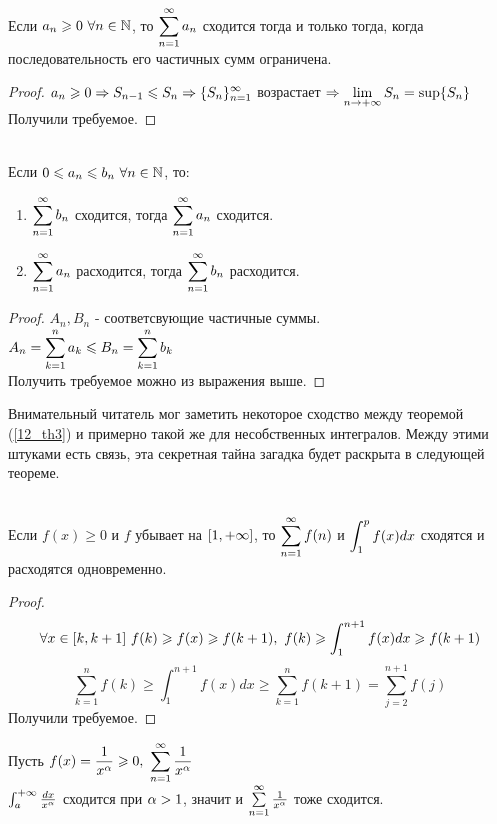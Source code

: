 \begin{theorem}\label{12_th2}\\
	Если $a_n\geqslant0\ \forall n\in\mathbb{N}$, то $\ds\sum_{n=1}^\i a_n$ сходится тогда и только тогда, когда последовательность его частичных сумм ограничена.
\end{theorem}
\begin{proof}
	$\displaystyle a_n\geqslant0\Rightarrow S_{n-1}\leqslant S_n\Rightarrow\{S_n\}_{n=1}^\infty$ возрастает $\ds\Ra\lim_{n\ra\p}S_n=\sup\{S_n\}$\\
	Получили требуемое.
\end{proof}
\begin{theorem}\label{12_th3}\\
	Если $0\leqslant a_n\leqslant b_n\ \forall n\in\mathbb{N}$, то:
	\begin{enumerate}
		\item $\ds\ss b_n$ сходится, тогда $\ds\ss a_n$ сходится.
		\item $\ds\ss a_n$ расходится, тогда $\ds\ss b_n$ расходится.
	\end{enumerate}
\end{theorem}
\begin{proof}
	$A_n,B_n$ - соответсвующие частичные суммы.\\
	$\ds A_n=\sum_{k=1}^n a_k\le B_n=\sum_{k=1}^n b_k$\\
	Получить требуемое можно из выражения выше.
\end{proof}
\begin{note}
	Внимательный читатель мог заметить некоторое сходство между теоремой (\ref{12_th3}) и примерно такой же для несобственных интегралов. Между этими штуками есть связь, эта секретная тайна загадка будет раскрыта в следующей теореме.
\end{note}
\begin{theorem}\label{12_th4}\\
	Если $f(x)\ge0$ и $f$ убывает на $[1,{+\infty}]$, то $\ds\ss f(n)$ и $\displaystyle\int_1^pf(x)dx$ сходятся и расходятся одновременно.
\end{theorem}
\begin{proof}
	\[\ds\fa x\in[k,k+1]\ f(k)\ge f(x)\ge f(k+1),\ f(k)\ge\int_1^{n+1}f(x)dx\ge f(k+1)\]
	\[\sum_{k=1}^nf(k)\ge\int_1^{n+1}f(x)dx\ge\sum_{k=1}^nf(k+1)=\sum_{j=2}^{n+1}f(j)\]
	Получили требуемое.
\end{proof}
\begin{example}
	Пусть $\ds f(x)=\frac1{x^\al}\ge0,\ \ss\frac1{x^\al}$\\
	$\int_a^{+\infty}\frac{dx}{x^\alpha}$ сходится при $\alpha>1$, значит и $\ss\frac1{x^\al}$ тоже сходится.
\end{example}

